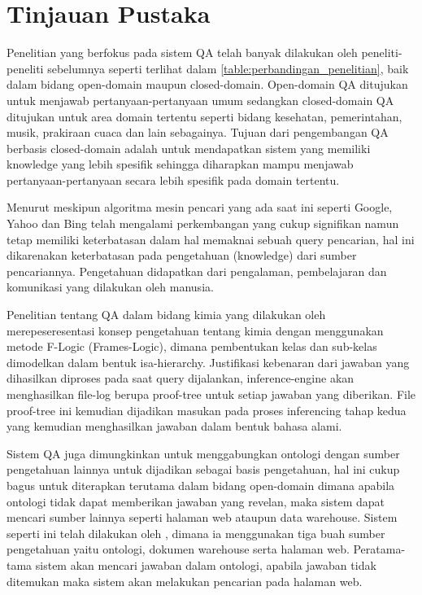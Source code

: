 \section{Tinjauan Pustaka}
Penelitian yang berfokus pada sistem QA telah banyak dilakukan oleh peneliti-peneliti sebelumnya seperti terlihat dalam \ref{table:perbandingan_penelitian}, baik dalam bidang open-domain maupun closed-domain. Open-domain QA ditujukan untuk menjawab pertanyaan-pertanyaan umum sedangkan closed-domain QA ditujukan untuk area domain tertentu seperti bidang kesehatan, pemerintahan, musik, prakiraan cuaca dan lain sebagainya. Tujuan dari pengembangan QA berbasis closed-domain adalah untuk mendapatkan sistem yang memiliki knowledge yang lebih spesifik sehingga diharapkan mampu menjawab pertanyaan-pertanyaan secara lebih spesifik pada domain tertentu.

Menurut \citet{zadeh} meskipun algoritma mesin pencari yang ada saat ini seperti Google, Yahoo dan Bing telah mengalami perkembangan yang cukup signifikan namun tetap memiliki keterbatasan dalam hal memaknai sebuah query pencarian, hal ini dikarenakan keterbatasan pada pengetahuan (knowledge) dari sumber pencariannya. Pengetahuan didapatkan dari pengalaman, pembelajaran dan komunikasi yang dilakukan oleh manusia.

Penelitian tentang QA dalam bidang kimia yang dilakukan oleh \citet{angele} merepeseresentasi konsep pengetahuan tentang kimia dengan menggunakan metode F-Logic (Frames-Logic), dimana pembentukan kelas dan sub-kelas dimodelkan dalam bentuk isa-hierarchy. Justifikasi kebenaran dari jawaban yang dihasilkan diproses pada saat query dijalankan, inference-engine akan menghasilkan file-log berupa proof-tree untuk setiap jawaban yang diberikan. File proof-tree ini kemudian dijadikan masukan pada proses inferencing tahap kedua yang kemudian menghasilkan jawaban dalam bentuk bahasa alami.

Sistem QA juga dimungkinkan untuk menggabungkan ontologi dengan sumber pengetahuan lainnya untuk dijadikan sebagai basis pengetahuan, hal ini cukup bagus untuk diterapkan terutama dalam bidang open-domain dimana apabila ontologi tidak dapat memberikan jawaban yang revelan, maka sistem dapat mencari sumber lainnya seperti halaman web ataupun data warehouse. Sistem seperti ini telah dilakukan oleh \citet*{guo_zhang}, dimana ia menggunakan tiga buah sumber pengetahuan yaitu ontologi, dokumen warehouse serta halaman web. Peratama-tama sistem akan mencari jawaban dalam ontologi, apabila jawaban tidak ditemukan maka sistem akan melakukan pencarian pada halaman web.

